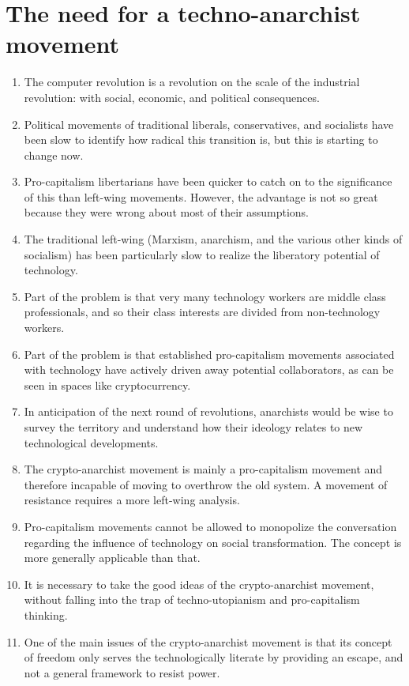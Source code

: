 \documentclass{article}
\begin{document}
\section{The need for a techno-anarchist movement}
\begin{enumerate}
\item The computer revolution is a revolution on the scale of the industrial revolution: with social, economic, and political consequences.
\item Political movements of traditional liberals, conservatives, and socialists have been slow to identify how radical this transition is, but this is starting to change now.
\item Pro-capitalism libertarians have been quicker to catch on to the significance of this than left-wing movements. However, the advantage is not so great because they were wrong about most of their assumptions.
\item The traditional left-wing (Marxism, anarchism, and the various other kinds of socialism) has been particularly slow to realize the liberatory potential of technology.
\item Part of the problem is that very many technology workers are middle class professionals, and so their class interests are divided from non-technology workers.
\item Part of the problem is that established pro-capitalism movements associated with technology have actively driven away potential collaborators, as can be seen in spaces like cryptocurrency.
\item In anticipation of the next round of revolutions, anarchists would be wise to survey the territory and understand how their ideology relates to new technological developments.
\item The crypto-anarchist movement is mainly a pro-capitalism movement and therefore incapable of moving to overthrow the old system. A movement of resistance requires a more left-wing analysis.
\item Pro-capitalism movements cannot be allowed to monopolize the conversation regarding the influence of technology on social transformation. The concept is more generally applicable than that.
\item It is necessary to take the good ideas of the crypto-anarchist movement, without falling into the trap of techno-utopianism and pro-capitalism thinking.
\item One of the main issues of the crypto-anarchist movement is that its concept of freedom only serves the technologically literate by providing an escape, and not a general framework to resist power.

\end{enumerate}
\end{document}
